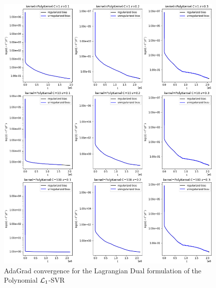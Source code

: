 \begin{figure}[H]
	\centering
	\includegraphics[scale=0.55]{img/laplacian_lagrangian_dual_l1_svr_loss_history}
	\caption{AdaGrad convergence for the Lagrangian Dual formulation of the Polynomial $\protect \mathcal{L}_1$-SVR}
	\label{fig:laplacian_lagrangian_dual_l1_svr_loss_history}
\end{figure}

